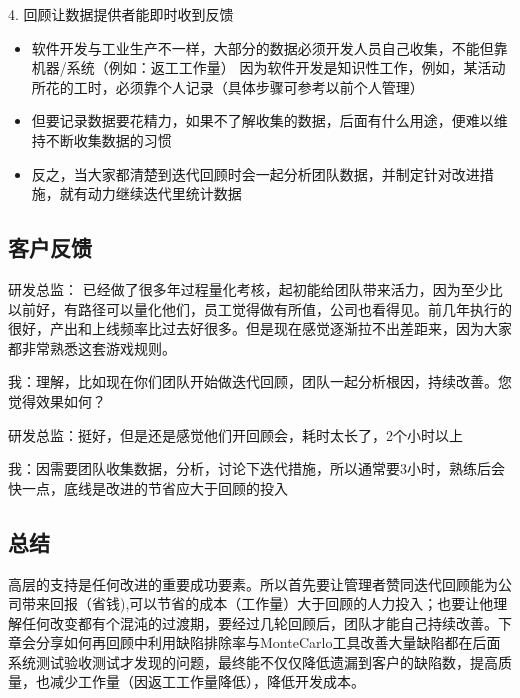 4. 回顾让数据提供者能即时收到反馈\\

\begin{itemize}
\tightlist
\item
  软件开发与工业生产不一样，大部分的数据必须开发人员自己收集，不能但靠机器/系统（例如：返工工作量） 因为软件开发是知识性工作，例如，某活动所花的工时，必须靠个人记录（具体步骤可参考以前个人管理）
\item
  但要记录数据要花精力，如果不了解收集的数据，后面有什么用途，便难以维持不断收集数据的习惯
\item
  反之，当大家都清楚到迭代回顾时会一起分析团队数据，并制定针对改进措施，就有动力继续迭代里统计数据
\end{itemize}

\hypertarget{ux5ba2ux6237ux53cdux9988}{%
\subsection{客户反馈}\label{ux5ba2ux6237ux53cdux9988}}

研发总监：
已经做了很多年过程量化考核，起初能给团队带来活力，因为至少比以前好，有路径可以量化他们，员工觉得做有所值，公司也看得见。前几年执行的很好，产出和上线频率比过去好很多。但是现在感觉逐渐拉不出差距来，因为大家都非常熟悉这套游戏规则。

我：理解，比如现在你们团队开始做迭代回顾，团队一起分析根因，持续改善。您觉得效果如何？

研发总监：挺好，但是还是感觉他们开回顾会，耗时太长了，2个小时以上

我：因需要团队收集数据，分析，讨论下迭代措施，所以通常要3小时，熟练后会快一点，底线是改进的节省应大于回顾的投入

\hypertarget{ux603bux7ed3}{%
\subsection{总结}\label{ux603bux7ed3}}

高层的支持是任何改进的重要成功要素。所以首先要让管理者赞同迭代回顾能为公司带来回报（省钱),可以节省的成本（工作量）大于回顾的人力投入；也要让他理解任何改变都有个混沌的过渡期，要经过几轮回顾后，团队才能自己持续改善。下章会分享如何再回顾中利用缺陷排除率与MonteCarlo工具改善大量缺陷都在后面系统测试验收测试才发现的问题，最终能不仅仅降低遗漏到客户的缺陷数，提高质量，也减少工作量（因返工工作量降低），降低开发成本。

